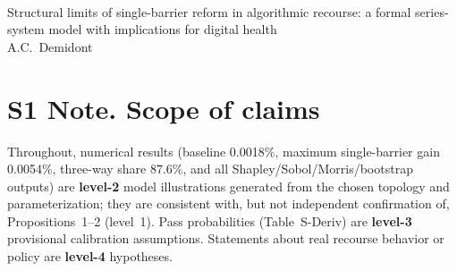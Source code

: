 \documentclass[10pt,letterpaper]{article}
\begin{document}
\vspace*{0.2in}
\begin{flushleft}
{\Large \textbf{}}\newline\\
Structural limits of single-barrier reform in algorithmic recourse: a formal series-system model with implications for digital health\\
\medskip A.C.\ Demidont
\end{flushleft}
\bigskip
\tableofcontents
\newpage

\section*{S1 Note. Scope of claims}
Throughout, numerical results (baseline 0.0018\%, maximum single-barrier gain 0.0054\%, three-way share 87.6\%, and all Shapley/Sobol/Morris/bootstrap outputs) are \textbf{level-2} model illustrations generated from the chosen topology and parameterization; they are consistent with, but not independent confirmation of, Propositions~1--2 (level~1). Pass probabilities (Table~S-Deriv) are \textbf{level-3} provisional calibration assumptions. Statements about real recourse behavior or policy are \textbf{level-4} hypotheses.
\end{document}
